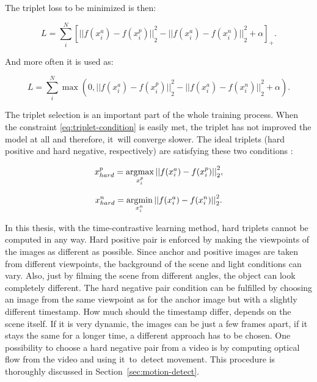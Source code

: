The triplet loss to be minimized is then:

\begin{equation}
    \label{eq:triplet-loss1}
    L = \sum\limits^{N}_{i}
    \left[
    {|| f(x^{a}_{i}) - f(x^{p}_{i}) ||}^{2}_{2} - {|| f(x^{a}_{i}) - f(x^{n}_{i}) ||}^{2}_{2} + \alpha
    \right]_{+}.
\end{equation}

\noindent And more often it is used as:

\begin{equation}
    \label{eq:triplet-loss2}
    L = \sum\limits^{N}_{i}
    \max{(0, {|| f(x^{a}_{i}) - f(x^{p}_{i}) ||}^{2}_{2} - {|| f(x^{a}_{i}) - f(x^{n}_{i}) ||}^{2}_{2} + \alpha)}.
\end{equation}

\newpage The triplet selection is an important part of the whole training process. When the constraint \ref{eq:triplet-condition} is easily met, the triplet has not improved the model at all and therefore, it~will converge slower. The ideal triplets (hard positive and hard negative, respectively) are satisfying these two conditions \cite{facenet-triplet-loss}:

\begin{equation}
    \label{eq:triplet-sel1}
    x^{p}_{hard} = \operatorname*{arg\!\max}_{x^{p}_{i}}{{|| f(x^{a}_{i}) - f(x^{p}_{i}) ||}^{2}_{2}},
\end{equation}

\begin{equation}
    \label{eq:triplet-sel2}
    x^{n}_{hard} = \operatorname*{arg\!\min}_{x^{n}_{i}}{{|| f(x^{a}_{i}) - f(x^{n}_{i}) ||}^{2}_{2}}.
\end{equation}

In this thesis, with the time-contrastive learning method, hard triplets cannot be computed in any way. Hard positive pair is enforced by making the viewpoints of the images as different as possible. Since anchor and positive images are taken from different viewpoints, the background of the scene and light conditions can vary. Also, just by filming the scene from different angles, the object can look completely different. The hard negative pair condition can be fulfilled by choosing an image from the same viewpoint as for the anchor image but with a slightly different timestamp. How much should the timestamp differ, depends on the scene itself. If it is very dynamic, the images can be just a few frames apart, if it stays the same for a longer time, a different approach has to be chosen. One possibility to choose a hard negative pair from a video is by computing optical flow from the video and using it~to~detect movement. This procedure is thoroughly discussed in Section~\ref{sec:motion-detect}.

